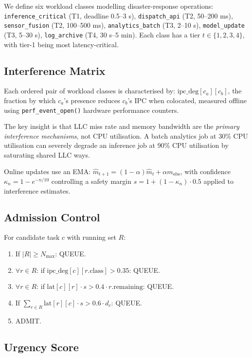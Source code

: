 \documentclass[sigconf,10pt]{acmart}
\begin{document}
We define six workload classes modelling disaster-response operations:
\texttt{inference\_critical} (T1, deadline 0.5--3 s),
\texttt{dispatch\_api} (T2, 50--200 ms),
\texttt{sensor\_fusion} (T2, 100--500 ms),
\texttt{analytics\_batch} (T3, 2--10 s),
\texttt{model\_update} (T3, 5--30 s),
\texttt{log\_archive} (T4, 30 s--5 min).
Each class has a tier $t \in \{1,2,3,4\}$, with tier-1 being most latency-critical.

\subsection{Interference Matrix}

Each ordered pair of workload classes is characterised by:
$\text{ipc\_deg}[c_a][c_b]$, the fraction by which $c_a$'s presence reduces
$c_b$'s IPC when colocated, measured offline using
\texttt{perf\_event\_open()} hardware performance counters.

The key insight is that LLC miss rate and memory bandwidth are the
\emph{primary interference mechanisms}, not CPU utilisation. A batch
analytics job at 30\% CPU utilisation can severely degrade an inference
job at 90\% CPU utilisation by saturating shared LLC ways.

Online updates use an EMA: $\hat{m}_{t+1} = (1-\alpha)\hat{m}_t + \alpha
m_\text{obs}$, with confidence $\kappa_n = 1 - e^{-n/10}$ controlling a
safety margin $s = 1 + (1-\kappa_n)\cdot 0.5$ applied to interference
estimates.

\subsection{Admission Control}

For candidate task $c$ with running set $R$:
\begin{enumerate}
  \item If $|R| \geq N_\text{max}$: QUEUE.
  \item $\forall r \in R$: if $\text{ipc\_deg}[c][r.\text{class}] > 0.35$: QUEUE.
  \item $\forall r \in R$: if $\text{lat}[c][r] \cdot s > 0.4 \cdot r.\text{remaining}$: QUEUE.
  \item If $\sum_{r \in R} \text{lat}[r][c] \cdot s > 0.6 \cdot d_c$: QUEUE.
  \item ADMIT.
\end{enumerate}

\subsection{Urgency Score}
\end{document}
